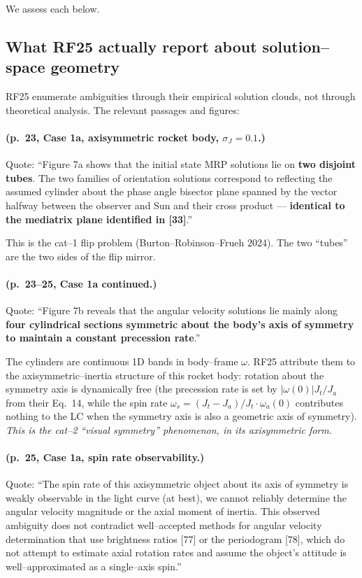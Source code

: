 \documentclass[11pt]{article}
\begin{document}
\noindent
We assess each below.

\subsection{What RF25 actually report about solution--space geometry}

\noindent
RF25 enumerate ambiguities through their empirical solution clouds, not
through theoretical analysis. The relevant passages and figures:

\paragraph{(p.~23, Case 1a, axisymmetric rocket body, $\sigma_J = 0.1$.)}
Quote: ``Figure 7a shows that the initial state MRP solutions lie on
\textbf{two disjoint tubes}. The two families of orientation solutions
correspond to reflecting the assumed cylinder about the phase angle
bisector plane spanned by the vector halfway between the observer and Sun
and their cross product --- \textbf{identical to the mediatrix plane
identified in [33]}.''

This is the cat--1 flip problem (Burton--Robinson--Frueh 2024). The two
``tubes'' are the two sides of the flip mirror.

\paragraph{(p.~23--25, Case 1a continued.)}
Quote: ``Figure 7b reveals that the angular velocity solutions lie mainly
along \textbf{four cylindrical sections symmetric about the body's axis of
symmetry to maintain a constant precession rate}.''

The cylinders are continuous 1D bands in body--frame $\omega$. RF25 attribute
them to the axisymmetric--inertia structure of this rocket body: rotation
about the symmetry axis is dynamically free (the precession rate is set by
$|\omega(0)|J_t / J_a$ from their Eq.~14, while the spin rate
$\omega_s = (J_t - J_a)/J_t \cdot \omega_a(0)$ contributes nothing to the
LC when the symmetry axis is also a geometric axis of symmetry).
\emph{This is the cat--2 ``visual symmetry'' phenomenon, in its axisymmetric
form.}

\paragraph{(p.~25, Case 1a, spin rate observability.)}
Quote: ``The spin rate of this axisymmetric object about its axis of
symmetry is weakly observable in the light curve (at best), we cannot
reliably determine the angular velocity magnitude or the axial moment of
inertia. This observed ambiguity does not contradict well--accepted methods
for angular velocity determination that use brightness ratios [77] or the
periodogram [78], which do not attempt to estimate axial rotation rates
and assume the object's attitude is well--approximated as a single--axis
spin.''
\end{document}

